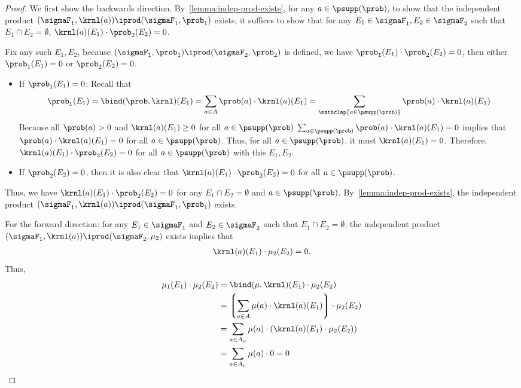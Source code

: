 \documentclass[acmsmall,nonacm,screen,appendix]{acmart}
\begin{document}
 \begin{proof}
    We first show the backwards direction.
  By~\cref{lemma:indep-prod-exists},
  for any $a \in \psupp(\prob)$, to show that the independent product
  $(\sigmaF_1, \krnl(a)) \iprod (\sigmaF_1, \prob_1)$ exists,
  it suffices to show that for any $E_1 \in \sigmaF_1, E_2 \in \sigmaF_2$
  such that $E_1 \cap E_2 = \emptyset$,
  $\krnl(a)(E_1) \cdot \prob_2(E_2) = 0$.

  Fix any such $E_1, E_2$,
  because $(\sigmaF_1, \prob_1) \iprod (\sigmaF_2, \prob_2)$ is defined,
  we have $\prob_1(E_1) \cdot \prob_2(E_2) = 0$, then either $\prob_1(E_1) = 0$
  or $\prob_2(E_2) = 0$.
\begin{itemize}
   \item If $\prob_1(E_1) = 0$:
   Recall that
\[
    \prob_1(E_1) = \bind(\prob, \krnl)(E_1)
    = \sum_{a \in A} \prob(a) \cdot \krnl(a) (E_1)
    = \sum_{\mathclap{a \in \psupp(\prob)}} \prob(a) \cdot \krnl(a) (E_1)
   \]
Because all $\prob(a) > 0$ and $\krnl(a) (E_1) \geq 0$ for all $a \in \psupp(\prob)$
   $\sum_{a \in \psupp(\prob)} \prob(a) \cdot \krnl(a) (E_1) = 0$ implies that
   $\prob(a) \cdot \krnl(a) (E_1) = 0$ for all $a \in \psupp(\prob)$.
   Thus, for all $a \in \psupp(\prob)$, it must $\krnl(a) (E_1) = 0$.
   Therefore, $\krnl(a)(E_1) \cdot \prob_2(E_2) = 0$ for all  $a \in \psupp(\prob)$
   with this $E_1, E_2$.

  \item If $\prob_2(E_2) = 0$, then it is also clear that
    $\krnl(a)(E_1) \cdot \prob_2(E_2) = 0$ for all  $a \in \psupp(\prob)$.
  \end{itemize}
Thus, we have $\krnl(a)(E_1) \cdot \prob_2(E_2) = 0$ for any
  $E_1 \cap E_2 = \emptyset$ and $a \in \psupp(\prob)$.
  By~\cref{lemma:indep-prod-exists},
  the independent product $(\sigmaF_1, \krnl(a)) \iprod (\sigmaF_1, \prob_1)$ exists.

    For the forward direction:
    for any $E_1 \in \sigmaF_1$ and $E_2 \in \sigmaF_2$ such that $E_1 \cap E_2 = \emptyset$,
   the independent product $(\sigmaF_1, \krnl(a)) \iprod (\sigmaF_2, \mu_2)$ exists implies that
   \begin{align*}
     \krnl(a) (E_1) \cdot \mu_2(E_2) = 0.
   \end{align*}
Thus,
   \begin{align*}
    \mu_1(E_1) \cdot \mu_2(E_2)
    &= \bind(\mu, \krnl)(E_1)  \cdot \mu_2(E_2) \\
    &= \left\lgroup\sum_{a \in A} \mu(a) \cdot \krnl(a) (E_1) \right\rgroup  \cdot \mu_2(E_2) \\
    &= \sum_{a \in A_{\mu}} \mu(a) \cdot \left(\krnl(a) (E_1)  \cdot \mu_2(E_2) \right) \\
    &= \sum_{a \in A_{\mu}} \mu(a) \cdot 0
    = 0
   \end{align*}


\end{proof}
\end{document}
